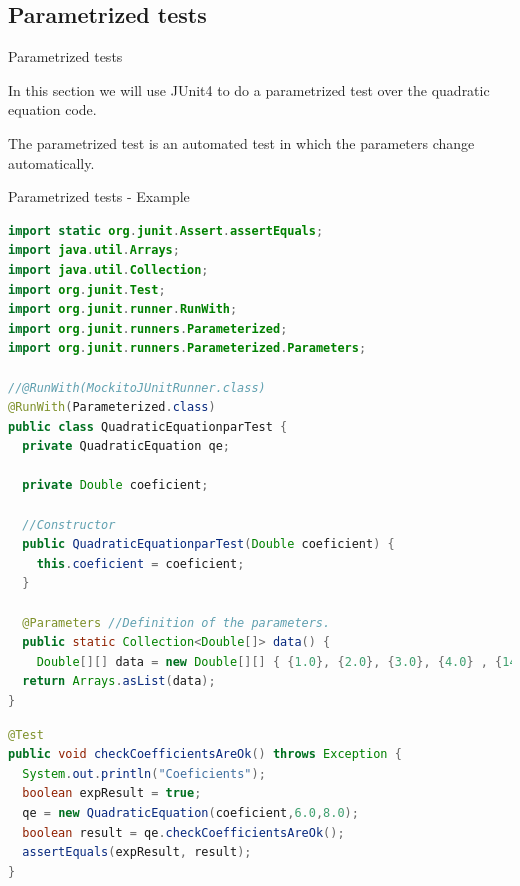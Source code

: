 \documentclass[11pt, xcolor=svgnames]{beamer}
\begin{document}

\subsection{Parametrized tests}


\begin{frame}{Parametrized tests}

In this section we will use JUnit4 to do a parametrized test over the quadratic equation code.

The parametrized test is an automated test in which the parameters change automatically.

\end{frame}


\begin{frame}[fragile]{Parametrized tests - Example}

\begin{lstlisting}[language=Java,basicstyle=\tiny]
import static org.junit.Assert.assertEquals;
import java.util.Arrays;
import java.util.Collection;
import org.junit.Test;
import org.junit.runner.RunWith;
import org.junit.runners.Parameterized;
import org.junit.runners.Parameterized.Parameters;

//@RunWith(MockitoJUnitRunner.class)
@RunWith(Parameterized.class)
public class QuadraticEquationparTest {
  private QuadraticEquation qe;

  private Double coeficient;

  //Constructor
  public QuadraticEquationparTest(Double coeficient) {
    this.coeficient = coeficient;
  }

  @Parameters //Definition of the parameters.
  public static Collection<Double[]> data() {
    Double[][] data = new Double[][] { {1.0}, {2.0}, {3.0}, {4.0} , {14.0} };
  return Arrays.asList(data);
}
\end{lstlisting}
\end{frame}



\begin{frame}[fragile]
\begin{lstlisting}[language=Java,basicstyle=\tiny]
@Test
public void checkCoefficientsAreOk() throws Exception {
  System.out.println("Coeficients");
  boolean expResult = true;
  qe = new QuadraticEquation(coeficient,6.0,8.0);
  boolean result = qe.checkCoefficientsAreOk();
  assertEquals(expResult, result);
}
\end{lstlisting}
\end{frame}
\end{document}
